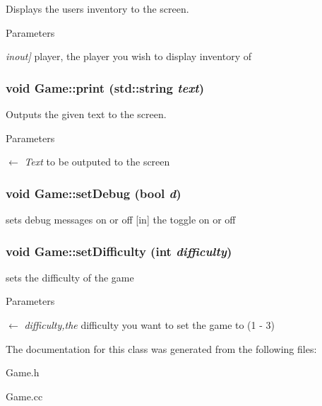 Displays the users inventory to the screen. 
\begin{DoxyParams}{Parameters}
\item[{\em inout\mbox{]}}]player, the player you wish to display inventory of \end{DoxyParams}
\hypertarget{classGame_ad94d7beb2a5072ee2d8379cce4962ced}{
\subsubsection[{print}]{\setlength{\rightskip}{0pt plus 5cm}void Game::print (std::string {\em text})}}
\label{classGame_ad94d7beb2a5072ee2d8379cce4962ced}


Outputs the given text to the screen. 
\begin{DoxyParams}{Parameters}
\item[\mbox{$\leftarrow$} {\em Text}]to be outputed to the screen \end{DoxyParams}
\hypertarget{classGame_afd7159db54f6bf097c54fdb21f9ffdab}{
\subsubsection[{setDebug}]{\setlength{\rightskip}{0pt plus 5cm}void Game::setDebug (bool {\em d})}}
\label{classGame_afd7159db54f6bf097c54fdb21f9ffdab}


sets debug messages on or off \mbox{[}in\mbox{]} the toggle on or off \hypertarget{classGame_acf32945c92475ff25c296b38b9090d7a}{
\subsubsection[{setDifficulty}]{\setlength{\rightskip}{0pt plus 5cm}void Game::setDifficulty (int {\em difficulty})}}
\label{classGame_acf32945c92475ff25c296b38b9090d7a}


sets the difficulty of the game 
\begin{DoxyParams}{Parameters}
\item[\mbox{$\leftarrow$} {\em difficulty,the}]difficulty you want to set the game to (1 -\/ 3) \end{DoxyParams}


The documentation for this class was generated from the following files:\begin{DoxyCompactItemize}
\item 
Game.h\item 
Game.cc\end{DoxyCompactItemize}
